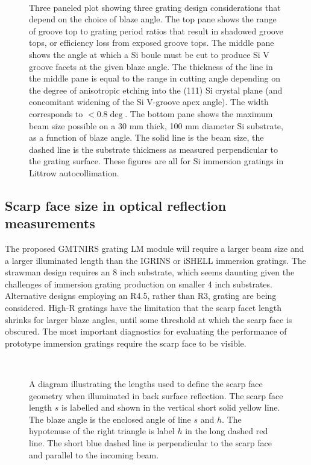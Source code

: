 \begin{figure}[h!] 
\begin{center}
\ 
\caption[Grating design considerations that depend on the choice of blaze angle]{Three paneled plot showing three grating design considerations that depend on the choice of blaze angle.  The top pane shows the range of groove top to grating period ratios that result in shadowed groove tops, or efficiency loss from exposed groove tops.  The middle pane shows the angle at which a Si boule must be cut to produce Si V groove facets at the given blaze angle.  The thickness of the line in the middle pane is equal to the range in cutting angle depending on the degree of anisotropic etching into the (111) Si crystal plane (and concomitant widening of the Si V-groove apex angle).  The width corresponds to $<0.8\deg$.  The bottom pane shows the maximum beam size possible on a 30 mm thick, 100 mm diameter Si substrate, as a function of blaze angle.  The solid line is the beam size, the dashed line is the substrate thickness as measured perpendicular to the grating surface.  These figures are all for Si immersion gratings in Littrow autocollimation.}
\label{fig:IGdesignplot}
\end{center}
\end{figure}

\subsection{Scarp face size in optical reflection measurements}
The proposed GMTNIRS grating LM module will require a larger beam size and a larger illuminated length than the IGRINS or iSHELL immersion gratings.  The strawman design requires an 8 inch substrate, which seems daunting given the challenges of immersion grating production on smaller 4 inch substrates.  Alternative designs employing an R4.5, rather than R3, grating are being considered.  High-R gratings have the limitation that the scarp facet length shrinks for larger blaze angles, until some threshold at which the scarp face is obscured.  The most important diagnostics for evaluating the performance of prototype immersion gratings require the scarp face to be visible.  

\begin{figure}[h!] 
\begin{center}
\ 
\caption[Scarp facet in reflection]{A diagram illustrating the lengths used to define the scarp face geometry when illuminated in back surface reflection.  The scarp face length $s$ is labelled and shown in the vertical short solid yellow line.  The blaze angle is the enclosed angle of line $s$ and $h$.  The hypotenuse of the right triangle is label $h$ in the long dashed red line.  The short blue dashed line is perpendicular to the scarp face and parallel to the incoming beam.  }
\label{fig:scarpface}
\end{center}
\end{figure}

